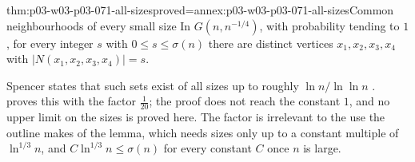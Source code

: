 \begin{hblemma}{thm:p03-w03-p03-071-all-sizes}{proved=annex:p03-w03-p03-071-all-sizes}{Common neighbourhoods of every small size}
In \(G(n,n^{-1/4})\), with probability tending to \(1\), for every integer
\(s\) with \(0\leq s\leq\sigma(n)\) there are distinct vertices
\(x_1,x_2,x_3,x_4\) with \(|N(x_1,x_2,x_3,x_4)|=s\).
\end{hblemma}

Spencer states that such sets exist of all sizes up to roughly
\(\ln n/\ln\ln n\) \cite[p.~24]{Spencer2007LogicRandomStructuresAuthor}.
 proves this with the factor
\(\frac1{20}\); the proof does not reach the constant \(1\), and no upper
limit on the sizes is proved here.  The factor is irrelevant to the use the
outline makes of the lemma, which needs sizes only up to a constant multiple
of \(\ln^{1/3}n\), and \(C\ln^{1/3}n\leq\sigma(n)\) for every constant \(C\)
once \(n\) is large.

